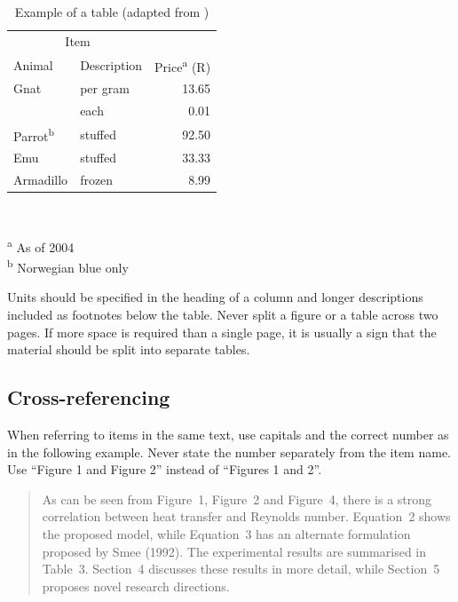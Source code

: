 \documentclass[a5paper, 10pt]{article}
\begin{document}
\begin{table}[htbp]
  \centering
  \caption{Example of a table (adapted from \citet{fear})}
  \label{tab:tabexample}
  \begin{minipage}{0.5\textwidth}
    \begin{centering}
      \begin{tabular}{@{}llr@{}} \toprule 
        \multicolumn{2}{c}{Item} \\ \cmidrule(r){1-2} 
        Animal & Description & Price\textsuperscript{a} (R)\\ \midrule 
        Gnat & per gram & \num{13.65} \\ 
        & each & \num{0.01} \\ 
        Parrot\textsuperscript{b} & stuffed & \num{92.50} \\ 
        Emu & stuffed & \num{33.33} \\ 
        Armadillo & frozen & \num{8.99} \\ \bottomrule 
      \end{tabular} \\
    \end{centering} 
    \vspace{1em}
    \textsuperscript{a} As of 2004 \\
    \textsuperscript{b} Norwegian blue only
  \end{minipage}
\end{table}

Units should be specified in the heading of a column and longer descriptions included as footnotes below the table.
Never split a figure or a table across two pages.
If more space is required than a single page, it is usually a sign that the material should be split into separate tables.

\subsection{Cross-referencing}
When referring to items in the same text, use capitals and the
correct number as in the following example. 
Never state the number separately from the item name. 
Use ``Figure 1 and Figure 2'' instead of ``Figures 1 and 2''.

\begin{quote}
  As can be seen from Figure~1, Figure~2 and Figure~4, there is a strong
  correlation between heat transfer and Reynolds number.  Equation~2
  shows the proposed model, while Equation~3 has an alternate
  formulation proposed by Smee (1992).  The experimental results are
  summarised in Table~3.  Section~4 discusses these results in more
  detail, while Section~5 proposes novel research directions.
\end{quote}
\end{document}
